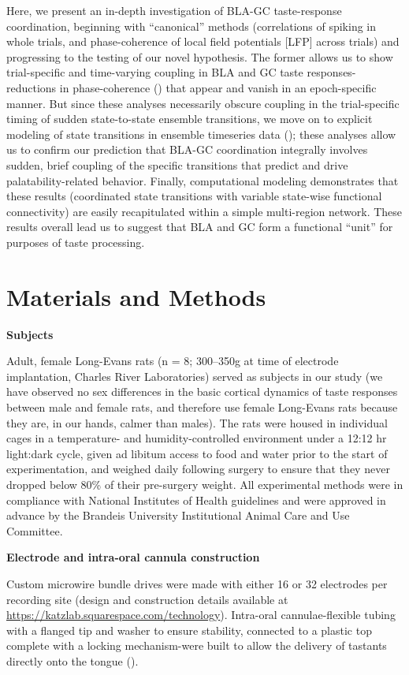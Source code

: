 \begin{refsection}
Here, we present an in-depth investigation of BLA-GC taste-response coordination, beginning with “canonical” methods (correlations of spiking in whole trials, and phase-coherence of local field potentials [LFP] across trials) and progressing to the testing of our novel hypothesis. The former allows us to show trial-specific and time-varying coupling in BLA and GC taste responses-reductions in phase-coherence (\cite{stitt2017a}) that appear and vanish in an epoch-specific manner. But since these analyses necessarily obscure coupling in the trial-specific timing of sudden state-to-state ensemble transitions, we move on to explicit modeling of state transitions in ensemble timeseries data (\cite{rabiner1989a,sadacca2016a}); these analyses allow us to confirm our prediction that BLA-GC coordination integrally involves sudden, brief coupling of the specific transitions that predict and drive palatability-related behavior. Finally, computational modeling demonstrates that these results (coordinated state transitions with variable state-wise functional connectivity) are easily recapitulated within a simple multi-region network. These results overall lead us to suggest that BLA and GC form a functional “unit” for purposes of taste processing. 

\section{Materials and Methods}


\textbf{Subjects}\par
\noindent Adult, female Long-Evans rats (n = 8; 300–350g at time of electrode implantation, Charles River Laboratories) served as subjects in our study (we have observed no sex differences in the basic cortical dynamics of taste responses between male and female rats, and therefore use female Long-Evans rats because they are, in our hands, calmer than males). The rats were housed in individual cages in a temperature- and humidity-controlled environment under a 12:12 hr light:dark cycle, given ad libitum access to food and water prior to the start of experimentation, and weighed daily following surgery to ensure that they never dropped below 80\% of their pre-surgery weight. All experimental methods were in compliance with National Institutes of Health guidelines and were approved in advance by the Brandeis University Institutional Animal Care and Use Committee.

\smallskip
\noindent\textbf{Electrode and intra-oral cannula construction}\par
\noindent Custom microwire bundle drives were made with either 16 or 32 electrodes per recording site (design and construction details available at \url{https://katzlab.squarespace.com/technology}). Intra-oral cannulae-flexible tubing with a flanged tip and washer to ensure stability, connected to a plastic top complete with a locking mechanism-were built to allow the delivery of tastants directly onto the tongue (\cite{fontanini2006a}).


\end{refsection}
